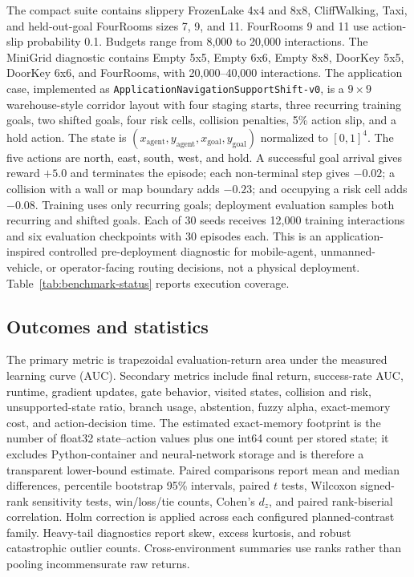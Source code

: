 \documentclass[preprint,12pt]{elsarticle}
\begin{document}
The compact suite contains slippery FrozenLake 4x4 and 8x8, CliffWalking,
Taxi, and held-out-goal FourRooms sizes 7, 9, and 11. FourRooms 9 and 11 use
action-slip probability 0.1. Budgets range from 8,000 to 20,000 interactions.
The MiniGrid diagnostic contains Empty 5x5, Empty 6x6, Empty 8x8, DoorKey 5x5,
DoorKey 6x6, and FourRooms, with 20,000--40,000 interactions.
The application case, implemented as
\texttt{ApplicationNavigationSupportShift-v0}, is a $9\times9$
warehouse-style corridor layout with four staging starts, three recurring
training goals, two shifted goals, four risk cells, collision penalties, 5\%
action slip, and a hold action. The state is
$(x_{\mathrm{agent}},y_{\mathrm{agent}},x_{\mathrm{goal}},y_{\mathrm{goal}})$
normalized to $[0,1]^4$. The five actions are north, east, south, west, and
hold. A successful goal arrival gives reward $+5.0$ and terminates the episode;
each non-terminal step gives $-0.02$; a collision with a wall or map boundary
adds $-0.23$; and occupying a risk cell adds $-0.08$. Training uses only
recurring goals; deployment evaluation samples both recurring and shifted
goals. Each of 30 seeds receives 12,000 training interactions and six
evaluation checkpoints with 30 episodes each. This is an application-inspired
controlled pre-deployment diagnostic for mobile-agent, unmanned-vehicle, or
operator-facing routing decisions, not a physical deployment.
Table~\ref{tab:benchmark-status} reports execution coverage.

\begin{table}[t]
\centering
\small
\caption{Eight main executed ASOC result families. All listed audits passed; auxiliary smoke checks are archived in the artifact but not used as performance evidence.}
\label{tab:benchmark-status}
\resizebox{\textwidth}{!}{}
\end{table}

\subsection{Outcomes and statistics}

The primary metric is trapezoidal evaluation-return area under the measured
learning curve (AUC). Secondary metrics include final return, success-rate AUC,
runtime, gradient updates, gate behavior, visited states, collision and risk,
unsupported-state ratio, branch usage, abstention, fuzzy alpha, exact-memory
cost, and action-decision time. The estimated exact-memory footprint is the
number of float32 state--action values plus one int64 count per stored state;
it excludes Python-container and neural-network storage and is therefore a
transparent lower-bound estimate. Paired
comparisons report mean and median differences, percentile bootstrap 95\%
intervals, paired $t$ tests, Wilcoxon signed-rank sensitivity tests,
win/loss/tie counts, Cohen's $d_z$, and paired rank-biserial correlation.
Holm correction is applied across each configured planned-contrast family.
Heavy-tail diagnostics report skew, excess kurtosis, and robust catastrophic
outlier counts. Cross-environment summaries use ranks rather than pooling
incommensurate raw returns.
\end{document}
